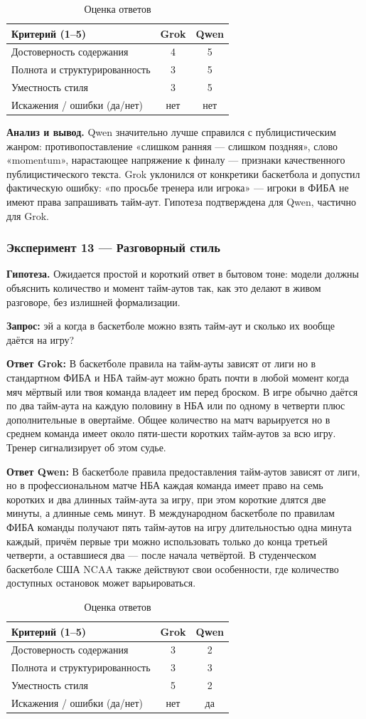 \documentclass[a4paper, final]{article}
\newcommand{\scoretablefilled}[8]{%
    \vspace{4pt}
    \begin{table}[h!]
    \centering
    \small
    \begin{tabular}{|l|c|c|}
    \hline
    \textbf{Критерий (1--5)} & \textbf{Grok} & \textbf{Qwen} \\
    \hline
    Достоверность содержания & #1 & #2 \\
    \hline
    Полнота и структурированность & #3 & #4 \\
    \hline
    Уместность стиля & #5 & #6 \\
    \hline
    Искажения / ошибки (да/нет) & #7 & #8 \\
    \hline
    \end{tabular}
    \caption{Оценка ответов}
    \end{table}
    \vspace{2pt}
}
\begin{document}
\scoretablefilled{4}{5}{3}{5}{3}{5}{нет}{нет}

\noindent\textbf{Анализ и вывод.} Qwen значительно лучше справился с публицистическим жанром: противопоставление «слишком ранняя — слишком поздняя», слово «momentum», нарастающее напряжение к финалу — признаки качественного публицистического текста. Grok уклонился от конкретики баскетбола и допустил фактическую ошибку: «по просьбе тренера или игрока» — игроки в ФИБА не имеют права запрашивать тайм-аут. Гипотеза подтверждена для Qwen, частично для Grok.

\newpage

\subsubsection{Эксперимент 13 — Разговорный стиль}

\noindent\textbf{Гипотеза.} Ожидается простой и короткий ответ в бытовом тоне: модели должны объяснить количество и момент тайм-аутов так, как это делают в живом разговоре, без излишней формализации.

\noindent\textbf{Запрос:} эй а когда в баскетболе можно взять тайм-аут и сколько их вообще даётся на игру?

\noindent\textbf{Ответ Grok:} В баскетболе правила на тайм-ауты зависят от лиги но в стандартном ФИБА и НБА тайм-аут можно брать почти в любой момент когда мяч мёртвый или твоя команда владеет им перед броском. В игре обычно даётся по два тайм-аута на каждую половину в НБА или по одному в четверти плюс дополнительные в овертайме. Общее количество на матч варьируется но в среднем команда имеет около пяти-шести коротких тайм-аутов за всю игру. Тренер сигнализирует об этом судье.

\noindent\textbf{Ответ Qwen:} В баскетболе правила предоставления тайм-аутов зависят от лиги, но в профессиональном матче НБА каждая команда имеет право на семь коротких и два длинных тайм-аута за игру, при этом короткие длятся две минуты, а длинные семь минут. В международном баскетболе по правилам ФИБА команды получают пять тайм-аутов на игру длительностью одна минута каждый, причём первые три можно использовать только до конца третьей четверти, а оставшиеся два — после начала четвёртой. В студенческом баскетболе США NCAA также действуют свои особенности, где количество доступных остановок может варьироваться.

\scoretablefilled{3}{2}{3}{3}{5}{2}{нет}{да}
\end{document}
